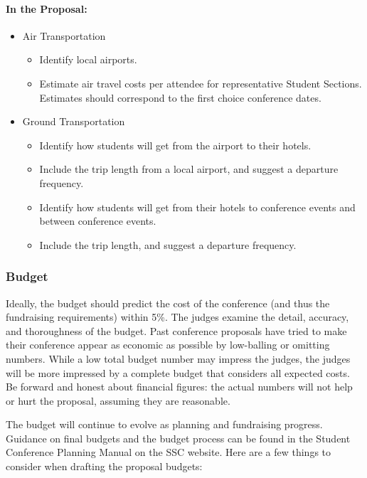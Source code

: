 \documentclass[12pt]{article}
\begin{document}
\paragraph{In the Proposal:}
\begin{itemize}
    \item{Air Transportation
    \begin{itemize}
        \item{Identify local airports.}
        \item{Estimate air travel costs per attendee for representative Student Sections.
        Estimates should correspond to the first choice conference dates.}
    \end{itemize}
    }
    \item{Ground Transportation
    \begin{itemize}
        \item{Identify how students will get from the airport to their hotels.}
        \item{Include the trip length from a local airport, and suggest a departure frequency.}
        \item{Identify how students will get from their hotels to conference events and between conference events.}
        \item{Include the trip length, and suggest a departure frequency.}
    \end{itemize}
}
\end{itemize}

\subsubsection{Budget}
Ideally, the budget should predict the cost of the conference (and thus the fundraising requirements) within 5\%. The judges examine the detail, accuracy, and thoroughness of the budget. Past conference proposals have tried to make their conference appear as economic as possible by low-balling or omitting numbers. While a low total budget number may impress the judges, the judges will be more impressed by a complete budget that considers all expected costs. Be forward and honest about financial figures: the actual numbers will not help or hurt the proposal, assuming they are reasonable.

The budget will continue to evolve as planning and fundraising progress. Guidance on final budgets and the budget process can be found in the Student Conference Planning Manual on the SSC website. Here are a few things to consider when drafting the proposal budgets:
\end{document}
